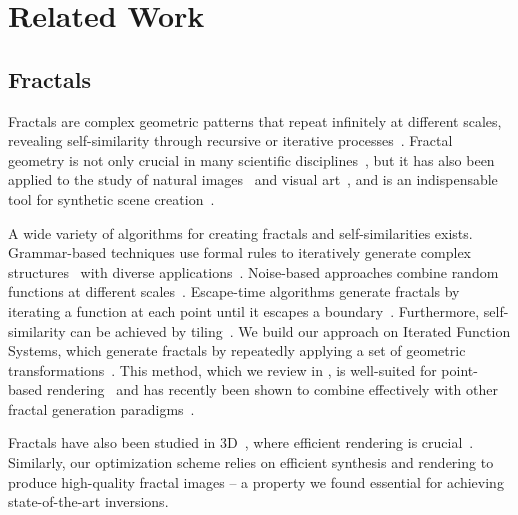 \section{Related Work}
\label{sec:related_work}


\subsection{Fractals}
\label{sec:fractals}

Fractals are complex geometric patterns that repeat infinitely at different scales, revealing self-similarity through recursive or iterative processes~\cite{mandelbrot1980fractal,mandelbrot1982fractal,peitgen2004chaos}.
Fractal geometry is not only crucial in many scientific disciplines~\cite{havlin1995fractals,turcotte1997fractals,song2005self,mandelbrot2013fractals}, but it has also been applied to the study of natural images~\cite{pentlandfractal1984, Turiel_2000} and visual art~\cite{redies2008fractal-like}, and is an indispensable tool for synthetic scene creation~\cite{demko1985construction,barnsley1988harnessing,ebert2002texturing,tzathas2024physically}.

A wide variety of algorithms for creating fractals and self-similarities exists. 
Grammar-based techniques use formal rules to iteratively generate complex structures~\cite{lindenmayer1968mathematical,rozenberg1980mathematical} with diverse applications~\cite{shlyakhter2001reconstructing,wonka2003instant,prusinkiewicz2012algorithmic}.
Noise-based approaches combine random functions at different scales~\cite{mandelbrot1968fractional,keshner19821}.
Escape-time algorithms generate fractals by iterating a function at each point until it escapes a boundary~\cite{mandelbrot2004fractals,julia1918memoire}.
Furthermore, self-similarity can be achieved by tiling~\cite{bandt1991self,fathauer2001fractal,ouyang2021self,chen2022learning}.
We build our approach on Iterated Function Systems, which generate fractals by repeatedly applying a set of geometric transformations~\cite{hutchinson1981fractals,barnsley1985iterated,barnsley1988fractals,elton1987ergodic}.
This method, which we review in , is well-suited for point-based rendering~\cite{tu2023learning,bannister2024learnable} and has recently been shown to combine effectively with other fractal generation paradigms~\cite{schor2024into}.

Fractals have also been studied in 3D~\cite{hart1989ray,norton1982generation}, where efficient rendering is crucial~\cite{carpentercomputer1980,hart1991efficient,MARTYN2010167,daSilva2021}. 
Similarly, our optimization scheme relies on efficient synthesis and rendering to produce high-quality fractal images -- a property we found essential for achieving state-of-the-art inversions.


